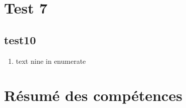 \documentclass{article}
\begin{document}
\section{Test 7}
\subsection{test10}
  \begin{enumerate}
    \item text nine in enumerate
 \end{enumerate}


\section{Résumé des compétences}



\end{document}
